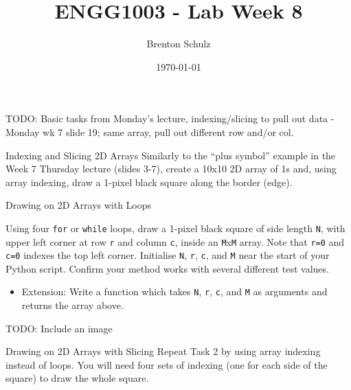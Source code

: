 \documentclass{lab}
\title{ENGG1003 - Lab Week 8}
\author{Brenton Schulz}
\date{\today}
\begin{document}
\maketitle

TODO: Basic tasks from Monday's lecture, indexing/slicing to pull out data - Monday wk 7 slide 19; same array, pull out different row and/or col.

\begin{task}{Indexing and Slicing 2D Arrays}{}
Similarly to the ``plus symbol'' example in the Week 7 Thursday lecture (slides 3-7), create a 10x10 2D array of 1s and, using array indexing, draw a 1-pixel black square along the border (edge).
\end{task}

\begin{task}{Drawing on 2D Arrays with Loops}{}

Using four \texttt{for} or \texttt{while} loops, draw a 1-pixel black square of side length \texttt{N}, with upper left corner at row \texttt{r} and column \texttt{c}, inside an \texttt{M}x\texttt{M} array. Note that \texttt{r=0} and \texttt{c=0} indexes the top left corner. Initialise \texttt{N}, \texttt{r}, \texttt{c}, and \texttt{M} near the start of your Python script. Confirm your method works with several different test values. 
	\begin{itemize}
		\item Extension: Write a function which takes \texttt{N}, \texttt{r}, \texttt{c}, and \texttt{M} as arguments and returns the array above.
	\end{itemize}
TODO: Include an image
\end{task}

\begin{task}{Drawing on 2D Arrays with Slicing}{}
Repeat Task 2 by using array indexing instead of loops. You will need four sets of indexing (one for each side of the square) to draw the whole square.
\end{task}
\end{document}
